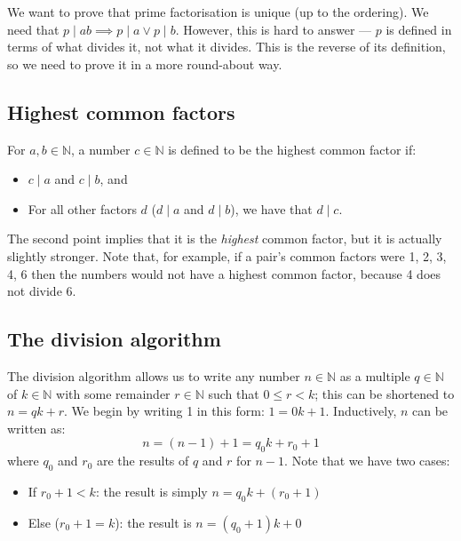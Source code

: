 We want to prove that prime factorisation is unique (up to the ordering).
We need that \(p \mid ab \implies p \mid a \lor p \mid b\).
However, this is hard to answer --- \(p\) is defined in terms of what divides it, not what it divides.
This is the reverse of its definition, so we need to prove it in a more round-about way.

\subsection{Highest common factors}
For \(a, b \in \mathbb N\), a number \(c \in \mathbb N\) is defined to be the highest common factor if:
\begin{itemize}
	\item \(c \mid a\) and \(c \mid b\), and
	\item For all other factors \(d\) (\(d \mid a\) and \(d \mid b\)), we have that \(d \mid c\).
\end{itemize}
The second point implies that it is the \textit{highest} common factor, but it is actually slightly stronger.
Note that, for example, if a pair's common factors were 1, 2, 3, 4, 6 then the numbers would not have a highest common factor, because 4 does not divide 6.

\subsection{The division algorithm}
The division algorithm allows us to write any number \(n \in \mathbb N\) as a multiple \(q\in\mathbb N\) of \(k\in \mathbb N\) with some remainder \(r\in\mathbb N\) such that \(0 \leq r < k\); this can be shortened to \(n = qk + r\).
We begin by writing 1 in this form: \(1 = 0k + 1\).
Inductively, \(n\) can be written as:
\[
	n = (n-1) + 1 = q_0 k + r_0 + 1
\]
where \(q_0\) and \(r_0\) are the results of \(q\) and \(r\) for \(n-1\).
Note that we have two cases:
\begin{itemize}
	\item If \(r_0 + 1 < k\): the result is simply \(n = q_0k + (r_0+1)\)
	\item Else (\(r_0 + 1 = k\)): the result is \(n = (q_0 + 1)k + 0\)
\end{itemize}

